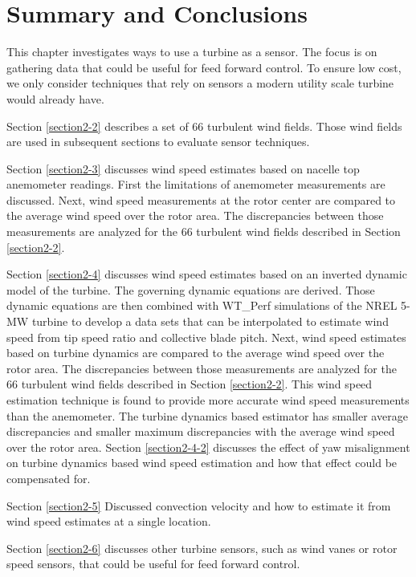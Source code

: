 
\section{Summary and Conclusions} \label{section2-7}

This chapter investigates ways to use a turbine as a sensor. The focus is on gathering data that could be useful for feed forward control. To ensure low cost, we only consider techniques that rely on sensors a modern utility scale turbine would already have.

Section \ref{section2-2} describes a set of 66 turbulent wind fields. Those wind fields are used in subsequent sections to evaluate sensor techniques. 

Section \ref{section2-3} discusses wind speed estimates based on nacelle top anemometer readings. First the limitations of anemometer measurements are discussed. Next, wind speed measurements at the rotor center are compared to the average wind speed over the rotor area. The discrepancies between those measurements are analyzed for the 66 turbulent wind fields described in Section \ref{section2-2}.
 
 Section \ref{section2-4} discusses wind speed estimates based on an inverted dynamic model of the turbine. The governing dynamic equations are derived. Those dynamic equations are then combined with WT\_Perf simulations of the NREL 5-MW turbine to develop a data sets that can be interpolated to estimate wind speed from tip speed ratio and collective blade pitch. Next, wind speed estimates based on turbine dynamics are compared to the average wind speed over the rotor area. The discrepancies between those measurements are analyzed for the 66 turbulent wind fields described in Section \ref{section2-2}. This wind speed estimation technique is found to provide more accurate wind speed measurements than the anemometer. The turbine dynamics based estimator has smaller average discrepancies and smaller maximum discrepancies with the average wind speed over the rotor area. Section \ref{section2-4-2} discusses the effect of yaw misalignment on turbine dynamics based wind speed estimation and how that effect could be compensated for. 
 
 Section \ref{section2-5} Discussed convection velocity and how to estimate it from wind speed estimates at a single location. 
 
 Section \ref{section2-6} discusses other turbine sensors, such as wind vanes or rotor speed sensors, that could be useful for feed forward control.